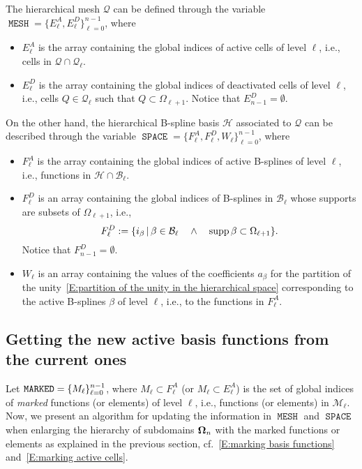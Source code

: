 \documentclass[a4paper]{siamltex1213}
\DeclareMathOperator\mesh{\texttt{MESH}}
\DeclareMathOperator\basis{\texttt{SPACE}}
\DeclareMathOperator\marked{\tt MARKED}
\newcommand\BB{\mathcal B}
\newcommand\MM{\mathcal M}
\newcommand\QQ{\mathcal Q}
\newcommand\HH{\mathcal H}
\begin{document}
The hierarchical mesh $\QQ$ can be defined through the variable $\mesh = \{E^A_\ell,E^D_\ell\}_{\ell=0}^{n-1}$,  where
\begin{itemize}
 \item $E^A_\ell$ is the array containing the global indices of active cells of level $\ell$, i.e., cells in $\QQ\cap\QQ_\ell$.
 \item $E^D_\ell$ is the array containing the global indices of deactivated cells of level $\ell$, i.e., cells $Q\in\QQ_\ell$ such that $Q\subset\Omega_{\ell+1}$. Notice that $E^D_{n-1}=\emptyset$.
 \end{itemize}
 On the other hand, the hierarchical B-spline basis $\HH$ associated to $\QQ$ can be described through the variable $\basis = \{F^A_\ell,F^D_\ell, W_\ell\}_{\ell=0}^{n-1}$, where
\begin{itemize}
 \item $F^A_\ell$ is the array containing the global indices of active B-splines of level $\ell$, i.e., functions in $\HH\cap\BB_\ell$.
  \item  $F^D_\ell$ is an array containing the global indices of B-splines in $\BB_\ell$ whose supports are subsets of $\Omega_{\ell+1}$, i.e.,
$$F^D_\ell:= \{i_\beta\,|\,\beta\in\BB_\ell\quad\wedge\quad \supp\beta\subset\Omega_{\ell+1}\}.$$
Notice that $F^D_{n-1}=\emptyset$. 
 \item $W_\ell$ is an array containing the values of the coefficients $a_\beta$ for the partition of the unity~\eqref{E:partition of the unity in the hierarchical space} corresponding to the active B-splines $\beta$ of level $\ell$, i.e., to the functions in $F^A_\ell$.
\end{itemize}



\subsection{Getting the new active basis functions from the current ones}
 

Let $\marked=\{M_\ell\}_{\ell=0}^{n-1}$, where $M_\ell\subset F^A_\ell$ (or $M_\ell\subset E^A_\ell$) is the set of global indices of \emph{marked} functions (or elements) of level $\ell$, i.e., functions (or elements) in $\MM_\ell$. Now, we present an algorithm for updating the information in $\mesh$ and $\basis$ when enlarging the hierarchy of subdomains ${\bf \Omega}_n$ with the marked functions or elements as explained in the previous section, cf.~\eqref{E:marking basis functions} and~\eqref{E:marking active cells}.
\end{document}
